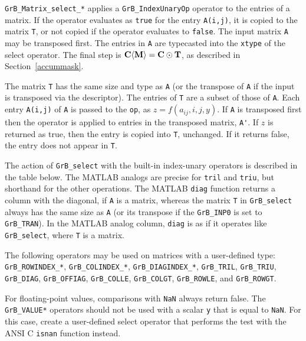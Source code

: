 \documentclass[12pt]{article}
\begin{document}
\verb'GrB_Matrix_select_*' applies a \verb'GrB_IndexUnaryOp' operator to the
entries of a matrix.  If the operator evaluates as \verb'true' for the entry
\verb'A(i,j)', it is copied to the matrix \verb'T', or not copied if the
operator evaluates to \verb'false'.  The input matrix \verb'A' may be
transposed first.  The entries in \verb'A' are typecasted into the \verb'xtype'
of the select operator.  The final step is ${\bf C \langle M \rangle  = C \odot
T}$, as described in Section~\ref{accummask}.

The matrix \verb'T' has the same size and type as \verb'A' (or the transpose of
\verb'A' if the input is transposed via the descriptor).  The entries of
\verb'T' are a subset of those of \verb'A'.  Each entry \verb'A(i,j)' of
\verb'A' is passed to the \verb'op', as $z=f(a_{ij},i,j,y)$.  If
\verb'A' is transposed first then the operator is applied to entries in the
transposed matrix, \verb"A'".  If $z$ is returned as true, then the entry is
copied into \verb'T', unchanged.  If it returns false, the entry does not
appear in \verb'T'.

The action of \verb'GrB_select' with the built-in index-unary operators is
described in the table below.  The MATLAB analogs are precise for \verb'tril'
and \verb'triu', but shorthand for the other operations.  The MATLAB
\verb'diag' function returns a column with the diagonal, if \verb'A' is a
matrix, whereas the matrix \verb'T' in \verb'GrB_select' always has the same
size as \verb'A' (or its transpose if the \verb'GrB_INP0' is set to
\verb'GrB_TRAN').  In the MATLAB analog column, \verb'diag' is as if it
operates like \verb'GrB_select', where \verb'T' is a matrix.

The following operators may be used on matrices with a user-defined type:
\verb'GrB_ROWINDEX_*',
\verb'GrB_COLINDEX_*',
\verb'GrB_DIAGINDEX_*',
\verb'GrB_TRIL', \newline
\verb'GrB_TRIU',
\verb'GrB_DIAG',
\verb'GrB_OFFIAG',
\verb'GrB_COLLE',
\verb'GrB_COLGT',
\verb'GrB_ROWLE',
and
\verb'GrB_ROWGT'.

For floating-point values, comparisons with \verb'NaN' always return false.
The \verb'GrB_VALUE*' operators should not be used with a scalar \verb'y' that is
equal to \verb'NaN'.  For this case, create a user-defined select operator that
performs the test with the ANSI C \verb'isnan' function instead.
\end{document}
